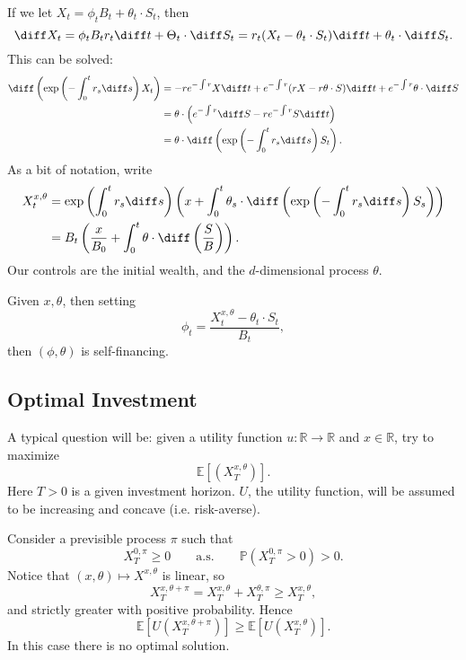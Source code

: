 \documentclass[12pt]{article}
\begin{document}
If we let $X_t = \phi_t B_t + \theta_t \cdot S_t$, then
\[
\diff X_t = \phi_t B_t r_t \diff t + \Theta_t \cdot \diff S_t = r_t(X_t - \theta_t \cdot S_t) \diff t + \theta_t \cdot \diff S_t.
\]
This can be solved:
\begin{align*}
	\diff \left( \exp \left( - \int_0^{t} r_s \diff s \right) X_t \right) &= - r e^{-\int r} X \diff t + e^{- \int r} (r X - r \theta \cdot S ) \diff t + e^{- \int r} \theta \cdot \diff S \\
									      &= \theta \cdot \left( e^{-\int r} \diff S - r e^{- \int r} S \diff t \right) \\
									      &= \theta \cdot \diff \left( \exp \left( - \int_0^{t} r_s \diff s \right) S_t \right).
\end{align*}
As a bit of notation, write
\begin{align*}
	X_t^{x, \theta} &= \exp \left( \int_0^{t} r_s \diff s \right) \left( x + \int_0^{t} \theta_s \cdot \diff \left( \exp \left( - \int_0^{t} r_s \diff s\right) S_s \right) \right) \\
&= B_t \left( \frac{x}{B_0} + \int_0^{t} \theta \cdot \diff \left( \frac{S}{B} \right) \right).
\end{align*}
Our controls are the initial wealth, and the $d$-dimensional process $\theta$.

\begin{remark}
	Given $x, \theta$, then setting
	\[
	\phi_t = \frac{X_{t}^{x, \theta} - \theta_t \cdot S_t}{B_t},
	\]
	then $(\phi, \theta)$ is self-financing.
\end{remark}

\subsection{Optimal Investment}%
\label{sub:oi}

A typical question will be: given a utility function $u : \mathbb{R} \to \mathbb{R}$ and $x \in \mathbb{R}$, try to maximize
\[
	\mathbb{E}[(X_T^{x, \theta})].
\]
Here $T > 0$ is a given investment horizon. $U$, the utility function, will be assumed to be increasing and concave (i.e. risk-averse).

Consider a previsible process $\pi$ such that
\[
	X_T^{0, \pi} \geq 0 \qquad\text{a.s.} \qquad \mathbb{P}(X_T^{0, \pi} > 0) > 0.
\]
Notice that $(x, \theta) \mapsto X^{x, \theta}$ is linear, so
\[
X_T^{x, \theta + \pi} = X_T^{x, \theta} + X_{T}^{\theta, \pi} \geq X_T^{x, \theta},
\]
and strictly greater with positive probability. Hence
\[
	\mathbb{E} [ U(X_T^{x, \theta + \pi})] \geq \mathbb{E}[ U(X_T^{x, \theta})].
\]
In this case there is no optimal solution.
\end{document}
